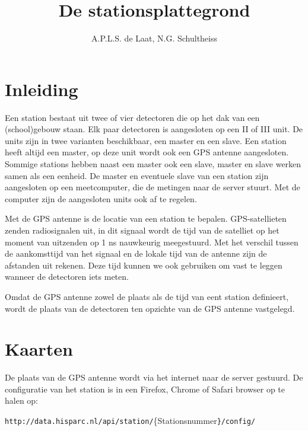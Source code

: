 



\title{De stationsplattegrond}
\author{A.P.L.S. de Laat, N.G. Schultheiss}

\maketitle

\section{Inleiding}

Een \hisparc station bestaat uit twee of vier detectoren die op het dak
van een (school)gebouw staan. Elk paar detectoren is aangesloten op een \hisparc II of \hisparc
III unit. De \hisparc units zijn in twee varianten beschikbaar, een
master en een slave. Een \hisparc station heeft altijd een \hisparc
master, op deze unit wordt ook een GPS antenne aangesloten. Sommige
stations hebben naast een master ook een slave, master en slave werken
samen als een eenheid. De master en eventuele slave van een station zijn
aangesloten op een meetcomputer, die de metingen naar de \hisparc server
stuurt. Met de computer zijn de aangesloten units ook af te regelen.

Met de GPS antenne is de locatie van een station te bepalen.
GPS-satellieten zenden radiosignalen uit, in dit signaal wordt de tijd
van de satelliet op het moment van uitzenden op 1 ns nauwkeurig meegestuurd.
Met het verschil tussen de aankomsttijd van het signaal en de lokale
tijd van de antenne zijn de afstanden uit rekenen. Deze tijd kunnen we
ook gebruiken om  vast te leggen wanneer de detectoren iets meten. 

Omdat de GPS antenne zowel de plaats als de tijd van eent station definieert,
wordt de plaats van de detectoren ten opzichte van de GPS antenne
vastgelegd.


\section{Kaarten}

De plaats van de GPS antenne wordt via het internet naar de \hisparc
server gestuurd. De configuratie van het station is in een Firefox,
Chrome of Safari browser op te halen op: 

\texttt{\small{http://data.hisparc.nl/api/station/}}{\small{\{Stationsnummer}}\texttt{\small{\}/config/}}{\small \par}

